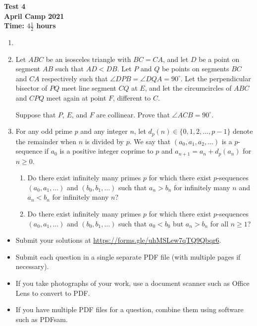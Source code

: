 \documentclass{article}
\begin{document}
\thispagestyle{empty}

\begin{center}
  \textbf{\Large Test 4}
  \\ \vspace{1em}
  \textbf{\large April Camp 2021}
  \\ \vspace{1em}
  \textbf{\large Time: $4\frac{1}{2}$ hours}
\end{center}

\vfill

\begin{enumerate}[leftmargin=0pt, itemsep=18pt]

\item


\item %
Let $ABC$ be an isosceles triangle with $BC = CA$, and let $D$ be a point on segment $AB$ such that $AD < DB$.
Let $P$ and $Q$ be points on segments $BC$ and $CA$ respectively such that $\angle DPB = \angle DQA = 90^\circ$.
Let the perpendicular bisector of $PQ$ meet line segment $CQ$ at $E$, and let the circumcircles of $ABC$ and $CPQ$ meet again at point $F$, different to $C$.

Suppose that $P$, $E$, and $F$ are collinear.
Prove that $\angle ACB = 90^\circ$.


\item %
For any odd prime $p$ and any integer $n$, let $d_p(n) \in \{0, 1, 2, \dotsc, p-1\}$ denote the remainder when $n$ is divided by $p$.
We say that $(a_0, a_1, a_2, \dotsc)$ is a $p$-sequence if $a_0$ is a positive integer coprime to $p$ and $a_{n+1} = a_n +d_p(a_n)$ for $n \geq 0$.
\begin{enumerate}[label=(\alph*)]
  \item Do there exist infinitely many primes $p$ for which there exist $p$-sequences $(a_0, a_1, \dotsc)$ and $(b_0, b_1, \dotsc)$ such that $a_n > b_n$ for infinitely many $n$ and $a_n < b_n$ for infinitely many $n$?
  \item Do there exist infinitely many primes $p$ for which there exist $p$-sequences $(a_0, a_1, \dotsc)$ and $(b_0, b_1, \dotsc)$ such that $a_0 < b_0$ but $a_n > b_n$ for all $n \geq 1$?
\end{enumerate}

\end{enumerate}


\vfill
\vfill
\begin{itemize}
	\item Submit your solutions at \url{https://forms.gle/uhMSLew7qTQ9Qbqr6}.
	\item Submit each question in a single separate PDF file (with multiple pages if necessary).
	\item If you take photographs of your work, use a document scanner such as Office Lens to convert to PDF.
	\item If you have multiple PDF files for a question, combine them using software such as PDFsam.
\end{itemize}
\end{document}
